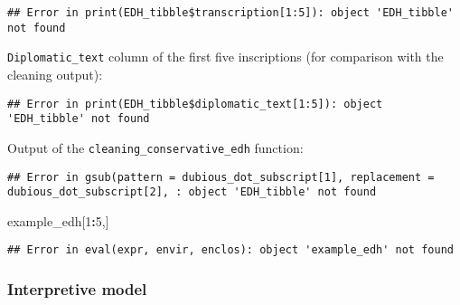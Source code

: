 \documentclass[]{article}
\newenvironment{Shaded}{\begin{snugshade}}{\end{snugshade}}
\newcommand{\DecValTok}[1]{\textcolor[rgb]{0.00,0.00,0.81}{#1}}
\newcommand{\KeywordTok}[1]{\textcolor[rgb]{0.13,0.29,0.53}{\textbf{#1}}}
\newcommand{\NormalTok}[1]{#1}
\newcommand{\OperatorTok}[1]{\textcolor[rgb]{0.81,0.36,0.00}{\textbf{#1}}}
\newcommand{\StringTok}[1]{\textcolor[rgb]{0.31,0.60,0.02}{#1}}
\begin{document}
\begin{verbatim}
## Error in print(EDH_tibble$transcription[1:5]): object 'EDH_tibble' not found
\end{verbatim}

\texttt{Diplomatic\_text} column of the first five inscriptions (for
comparison with the cleaning output):

\begin{Shaded}
\end{Shaded}

\begin{verbatim}
## Error in print(EDH_tibble$diplomatic_text[1:5]): object 'EDH_tibble' not found
\end{verbatim}

Output of the \texttt{cleaning\_conservative\_edh} function:

\begin{Shaded}
\end{Shaded}

\begin{verbatim}
## Error in gsub(pattern = dubious_dot_subscript[1], replacement = dubious_dot_subscript[2], : object 'EDH_tibble' not found
\end{verbatim}

\begin{Shaded}
\begin{Highlighting}[]
\NormalTok{example_edh[}\DecValTok{1}\OperatorTok{:}\DecValTok{5}\NormalTok{,]}
\end{Highlighting}
\end{Shaded}

\begin{verbatim}
## Error in eval(expr, envir, enclos): object 'example_edh' not found
\end{verbatim}

\hypertarget{interpretive-model-1}{%
\subsubsection{Interpretive model}\label{interpretive-model-1}}
\end{document}
